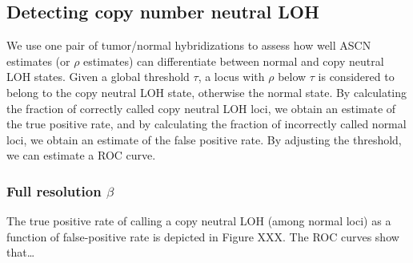 \documentclass[10pt]{bmc_article}
\newenvironment{bmcformat}{\fussy\setboolean{publ}{true}}{\fussy}
\begin{document}
\begin{bmcformat}
\begin{center}
 \label{figROCs,chr18}
\end{center}


\subsection*{Detecting copy number neutral LOH}
We use one pair of tumor/normal hybridizations to assess how well ASCN estimates (or $\rho$ estimates) can differentiate between normal and copy neutral LOH states. Given a global threshold $\tau$, a locus with $\rho$ below $\tau$ is considered to belong to the copy neutral LOH state, otherwise the normal state. By calculating the fraction of correctly called copy neutral LOH loci, we obtain an estimate of 
the true positive rate, and by calculating the fraction of incorrectly called normal loci, we obtain an estimate of the false positive rate. By adjusting the threshold, we can estimate a ROC curve. 

\subsubsection*{Full resolution $\beta$}
The true positive rate of calling a copy neutral LOH (among normal loci) as a function of false-positive rate is depicted in Figure XXX. The ROC curves show that\dots


\end{bmcformat}
\end{document}
